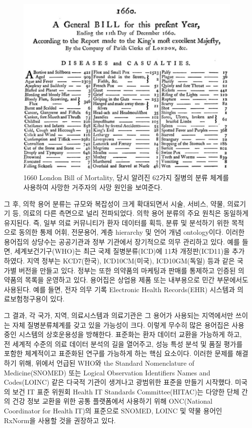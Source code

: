 \documentclass[10.5pt]{book}
\theoremstyle{definition}
\theoremstyle{definition}
\theoremstyle{definition}
\theoremstyle{remark}
\begin{document}
\begin{figure}

{\centering \includegraphics[width=1\linewidth]{images/StandardizedVocabularies/bill} 

}

\caption{1660 London Bill of Mortality, 당시 알려진 62가지 질병의 분류 체계를 사용하여 사망한 거주자의 사망 원인을 보여준다.}\label{fig:bill}
\end{figure}

그 후, 의학 용어 분류는 규모와 복잡성이 크게 확대되면서 시술, 서비스,
약물, 의료기기 등, 의료의 다른 측면으로 널리 전파되었다. 의학 용어
분류의 주요 원칙은 동일하게 유지된다. 즉, 일부 의료 커뮤니티가 환자
데이터를 획득, 분류 및 분석하기 위한 목적으로 동의한 통제 어휘,
전문용어, 계층 hierarchy 및 언어 개념 ontology이다. 이러한 용어집의
상당수는 공공기관과 정부 기관에서 장기적으로 의무 관리하고 있다. 예를
들면, 세계보건기구(WHO)는 최근 국제 질병분류(ICD)에 11차 개정판(ICD11)을
추가하였다. 지역 정부는 KCD7(한국), ICD10CM(미국), ICD10GM(독일) 등과
같은 국가별 버전을 만들고 있다. 정부는 또한 의약품의 마케팅과 판매를
통제하고 인증된 의약품의 목록을 운영하고 있다. 용어집은 상업용 제품 또는
내부용으로 민간 부문에서도 사용된다. 예를 들면, 전자 의무 기록
Electronic Health Records(EHR) 시스템과 의료보험청구용이 있다.

그 결과, 각 국가, 지역, 의료시스템과 의료기관은 그 용어가 사용되는
지역에서만 쓰이는 자체 질병분류체계를 갖고 있을 가능성이 크다. 이렇게
무수히 많은 용어집은 사용 중인 시스템의 상호운용성을 방해한다. 표준화는
환자 데이터 교환을 가능하게 하고, 전 세계적 수준의 의료 데이터 분석의
길을 열어주고, 성능 특성 분석 및 품질 평가를 포함한 체계적이고 표준화된
연구를 가능하게 하는 핵심 요소이다. 이러한 문제를 해결하기 위해, 위에서
언급된 WHO와 the Standard Nomenclature of Medicine(SNOMED) 또는 Logical
Observation Identifiers Names and Codes(LOINC) 같은 다국적 기관이
생겨나고 광범위한 표준을 만들기 시작했다. 미국의 보건 IT 표준 위원회
Health IT Standards Committee(HITAC)는 다양한 단체 간의 건강 정보 교환을
위한 공통 플랫폼에서 사용하기 위해 ONC(National Coordinator for Health
IT)의 표준으로 SNOMED, LOINC 및 약물 용어인 RxNorm을 사용할 것을
권장하고 있다.
\end{document}
